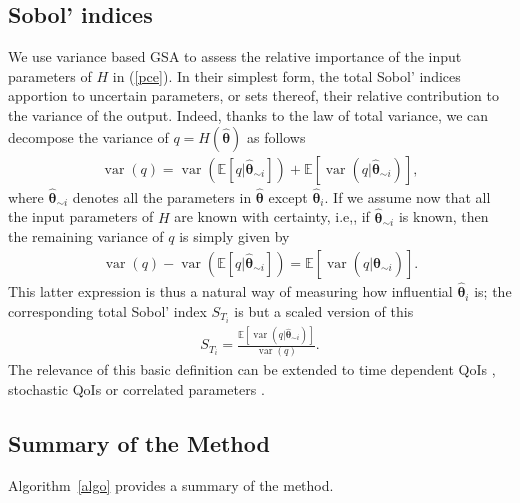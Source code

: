 \subsection{Sobol' indices} 
\label{sec:gsa}
We use variance based GSA to assess the relative importance of the input parameters of $H$ in (\ref{pce}). In their simplest form, the total Sobol' indices \cite{saltellitotalindex} apportion to uncertain parameters, or sets thereof, their relative contribution to the variance of the output. Indeed, thanks to the law of total variance, we can decompose the variance of $q = H(\hat{\boldsymbol{\theta}})$ as follows
\begin{eqnarray}
\operatorname{var}(q) = \operatorname{var}(\mathbb E[q|\hat{\boldsymbol{\theta}}_{\sim i}]) + \mathbb E[\operatorname{var}(q|\hat{\boldsymbol{\theta}}_{\sim i})], \label{ltv}
\end{eqnarray}
where $\hat{\boldsymbol{\theta}}_{\sim i}$ denotes all the parameters in $\hat{\boldsymbol{\theta}}$ except $\hat{\boldsymbol{\theta}}_i$. If we assume now that all the input parameters of $H$ are known with certainty, i.e,, if $\hat{\boldsymbol{\theta}}_{\sim i}$ is known, then the remaining variance of $q$ is simply given by 
\begin{eqnarray*}
\operatorname{var}(q) - \operatorname{var}(\mathbb E[q|\hat{\boldsymbol{\theta}}_{\sim i}]) = \mathbb E[\operatorname{var}(q|\hat{\boldsymbol{\theta}}_{\sim i})]. 
\end{eqnarray*}
This latter expression is thus a natural way of measuring how influential $\hat{\boldsymbol{\theta}}_i$ is; the corresponding total Sobol' index $S_{T_i}$ is but a scaled version of this
\begin{eqnarray}
S_{T_i} = \frac{\mathbb E[\operatorname{var}(q|\hat{\boldsymbol{\theta}}_{\sim i})]}{\operatorname{var}(q) }. \label{sobol}
\end{eqnarray}
The relevance of this basic definition can be extended to time dependent QoIs \cite{timegsa}, stochastic QoIs \cite{stogsa} or correlated parameters \cite{corvar}.


\subsection{Summary of the Method}
\label{sec:summary}
Algorithm~\ref{algo} provides a summary of the method. 

